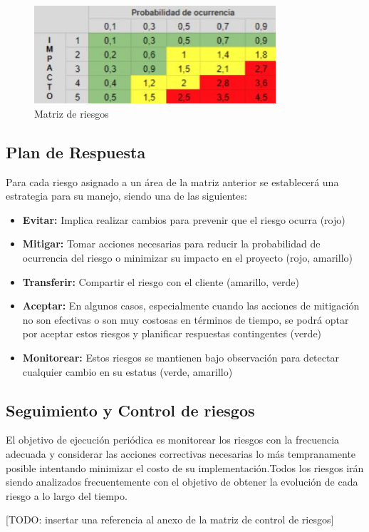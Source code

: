 \begin{figure}[H]
    \centering
    \includegraphics[width=0.8\textwidth]{../imagenes/secciones/6-Gestion-del-proyecto/matriz de riesgos.jpg}
    \caption{Matriz de riesgos}
    \label{fig:matrizDeRiesgos}
\end{figure}

\subsection{Plan de Respuesta}\label{subsec:planDeRespuesta}

Para cada riesgo asignado a un área de la matriz anterior se establecerá una estrategia para su manejo, siendo una de las siguientes:

\begin{itemize}
    \item \textbf{Evitar:} Implica realizar cambios para prevenir que el riesgo ocurra (rojo)
    \item \textbf{Mitigar:} Tomar acciones necesarias para reducir la probabilidad de ocurrencia del riesgo o minimizar su impacto 
    en el proyecto (rojo, amarillo)
    \item \textbf{Transferir:} Compartir el riesgo con el cliente (amarillo, verde)
    \item \textbf{Aceptar:} En algunos casos, especialmente cuando las acciones de mitigación no son efectivas o son muy costosas 
    en términos de tiempo, se podrá optar por aceptar estos riesgos y planificar respuestas contingentes (verde)
    \item \textbf{Monitorear:} Estos riesgos se mantienen bajo observación para detectar cualquier cambio en su estatus (verde, amarillo)
\end{itemize}

\subsection{Seguimiento y Control de riesgos}\label{subsec:monitoreoYControl}

El objetivo de ejecución periódica es monitorear los riesgos con la frecuencia adecuada y considerar las acciones correctivas necesarias 
lo más tempranamente posible intentando minimizar el costo de su implementación.Todos los riesgos irán siendo analizados frecuentemente 
con el objetivo de obtener la evolución de cada riesgo a lo largo del tiempo.

[TODO: insertar una referencia al anexo de la matriz de control de riesgos]